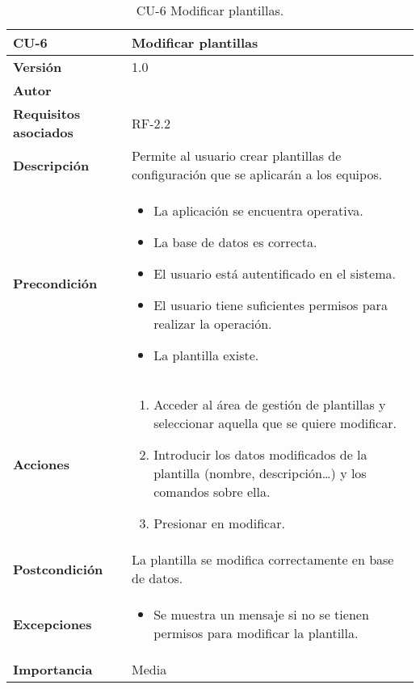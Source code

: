 \begin{table}[p]
	\centering
	\begin{tabularx}{\linewidth}{ p{} p{} }
		\toprule
		\textbf{CU-6}    & \textbf{ Modificar plantillas}\\
		\toprule
		\textbf{Versión}              & 1.0    \\
		\textbf{Autor}                & \@author{} \\
		\textbf{Requisitos asociados} & RF-2.2\\
		\textbf{Descripción}          & Permite al usuario crear plantillas de configuración que se aplicarán a los equipos.\\
		\textbf{Precondición}         &
		\begin{itemize}
			\tightlist
			\item La aplicación se encuentra operativa.
			\item La base de datos es correcta.
			\item El usuario está autentificado en el sistema.
			\item El usuario tiene suficientes permisos para realizar la operación.
			\item La plantilla existe.
		\end{itemize}\\
		\textbf{Acciones}             &
		\begin{enumerate}
			\tightlist
			\item Acceder al área de gestión de plantillas y seleccionar aquella que se quiere modificar.
			\item Introducir los datos modificados de la plantilla (nombre, descripción\dots) y los comandos sobre ella.
			\item Presionar en modificar.
		\end{enumerate}\\
		\textbf{Postcondición}        & La plantilla se modifica correctamente en base de datos.\\
		\textbf{Excepciones}          &
		\begin{itemize}
			\tightlist
			\item Se muestra un mensaje si no se tienen permisos para modificar la plantilla.
		\end{itemize}\\
		\textbf{Importancia}          & Media\\
		\bottomrule
	\end{tabularx}
	\caption{CU-6 Modificar plantillas.}\label{tab:table-6}
\end{table}

